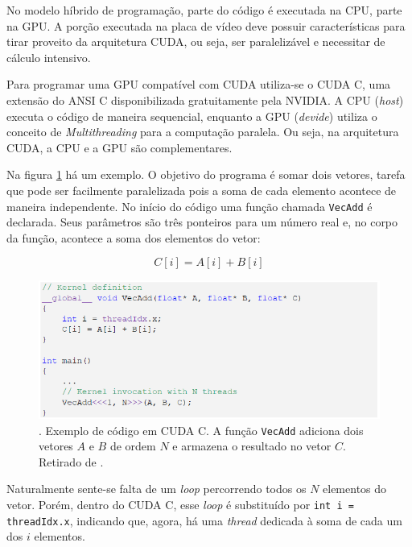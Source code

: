 	No modelo híbrido de programação, parte do código é executada na CPU, parte na GPU. A porção executada na placa de vídeo deve possuir características para tirar proveito da arquitetura CUDA, ou seja, ser paralelizável e necessitar de cálculo intensivo. 
	
	Para programar uma GPU compatível com CUDA utiliza-se o CUDA C, uma extensão do ANSI C disponibilizada gratuitamente pela NVIDIA. A CPU (\textit{host}) executa o código de maneira sequencial, enquanto a GPU (\textit{devide}) utiliza o conceito de \textit{Multithreading} para a computação paralela. Ou seja, na arquitetura CUDA, a CPU e a GPU são complementares.
	
	Na figura \ref{figCodigo} há um exemplo. O objetivo do programa é somar dois vetores, tarefa que pode ser facilmente paralelizada pois a soma de cada elemento acontece de maneira independente. No início do código uma função chamada \texttt{VecAdd} é declarada. Seus parâmetros são três ponteiros para um número real e, no corpo da função, acontece a soma dos elementos do vetor:
	
	\begin{equation}
		C[i] = A[i] + B[i]
	\end{equation}

\begin{figure}[hpt]
		\begin{center}
			\includegraphics[width=12cm]{figs/cuda/ExemploCodigo.png}
		\end{center}
		\caption{\label{figCodigo}. Exemplo de código em CUDA C. A função \texttt{VecAdd} adiciona dois vetores $A$ e $B$ de ordem $N$ e armazena o resultado no vetor $C$. Retirado de \cite{CUDACpg}.}
	\end{figure}

	Naturalmente sente-se falta de um \textit{loop} percorrendo todos os $N$ elementos do vetor. Porém, dentro do CUDA C, esse \textit{loop} é substituído por \mbox{\texttt{int i = threadIdx.x}}, indicando que, agora, há uma \textit{thread} dedicada à soma de cada um dos $i$ elementos.
	
